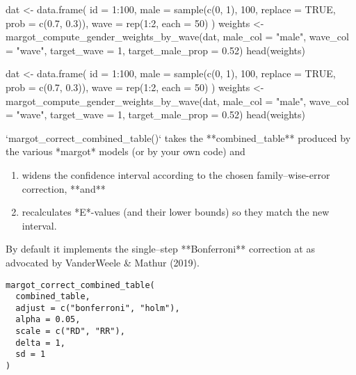 \documentclass[a4paper]{book}
\begin{document}
%
\begin{Examples}
\begin{ExampleCode}
dat <- data.frame(
  id = 1:100,
  male = sample(c(0, 1), 100, replace = TRUE, prob = c(0.7, 0.3)),
  wave = rep(1:2, each = 50)
)
weights <- margot_compute_gender_weights_by_wave(dat, male_col = "male",
                                                 wave_col = "wave",
                                                 target_wave = 1,
                                                 target_male_prop = 0.52)
head(weights)

dat <- data.frame(
  id = 1:100,
  male = sample(c(0, 1), 100, replace = TRUE, prob = c(0.7, 0.3)),
  wave = rep(1:2, each = 50)
)
weights <- margot_compute_gender_weights_by_wave(dat, male_col = "male",
                                                 wave_col = "wave",
                                                 target_wave = 1,
                                                 target_male_prop = 0.52)
head(weights)

\end{ExampleCode}
\end{Examples}
%
\begin{Description}
`margot\_correct\_combined\_table()` takes the **combined\_table** produced by the
various *margot* models (or by your own code) and
\begin{enumerate}

\item{} widens the confidence interval according to the chosen
family–wise-error correction, **and**
\item{} recalculates *E*-values (and their lower bounds) so they match the
new interval.

\end{enumerate}

By default it implements the single–step **Bonferroni** correction at
 as advocated by VanderWeele \& Mathur (2019).
\end{Description}
%
\begin{Usage}
\begin{verbatim}
margot_correct_combined_table(
  combined_table,
  adjust = c("bonferroni", "holm"),
  alpha = 0.05,
  scale = c("RD", "RR"),
  delta = 1,
  sd = 1
)
\end{verbatim}
\end{Usage}
%
\end{document}

